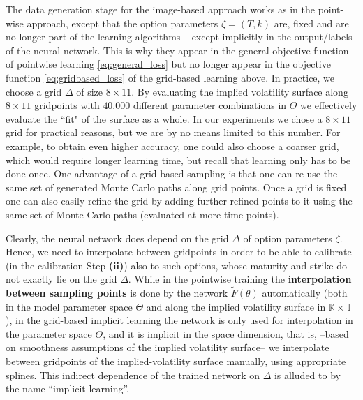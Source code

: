 \documentclass{article}
\theoremstyle{remark}
\def\green#1{\textcolor{green}{#1}}
\begin{document}

The data generation stage for the image-based approach works as in the
point-wise approach, except that the option parameters $\zeta = (T,k)$ are, fixed and are no longer part of the learning algorithms -- except
implicitly in the output/labels of the neural network. This is why they appear in the general objective function of pointwise learning \eqref{eq:general_loss} but no longer appear in the objective function \eqref{eq:gridbased_loss} of the grid-based learning  above.
In practice, we choose a grid $\Delta$ of size $8\times 11$. By evaluating the implied volatility surface along $8\times 11$ gridpoints with $40.000$ different parameter combinations in $\Theta$ we effectively evaluate the ``fit" of the surface as a whole. In our experiments we chose a $8\times 11$ grid for practical reasons, but we are by no means limited to this number. For example, to obtain even higher accuracy, one could also choose a coarser grid, which would require longer learning time, but recall that learning only has to be done once. One advantage of a grid-based sampling is that one can re-use the same set of generated Monte Carlo paths along grid points. Once a grid is fixed one can also easily refine the grid by adding further refined points to it using the same set of Monte Carlo paths (evaluated at more time points).

Clearly, the neural network does depend on the grid $\Delta$ of option
parameters $\zeta$. Hence, we need to interpolate between gridpoints in order to be able to calibrate (in the calibration Step \textbf{(ii)}) also to such options, whose
maturity and strike do not exactly lie on the grid $\Delta$. 
While in the pointwise training the \textbf{interpolation between sampling points} is done by the network $\widetilde{F}(\theta)$ automatically (both in the model parameter space $\Theta$ and along the implied volatility surface in $\mathbb{K}\times \mathbb{T}$), in the grid-based implicit learning the network is only used for interpolation in the parameter space $\Theta$, and it is implicit in the space dimension, that is, --based on smoothness assumptions of the implied volatility surface-- we
interpolate between gridpoints of the implied-volatility surface manually, using appropriate splines. This indirect dependence of the trained network on $\Delta$ is alluded to by the name ``implicit learning''.
\vspace*{0.2cm}
\end{document}
